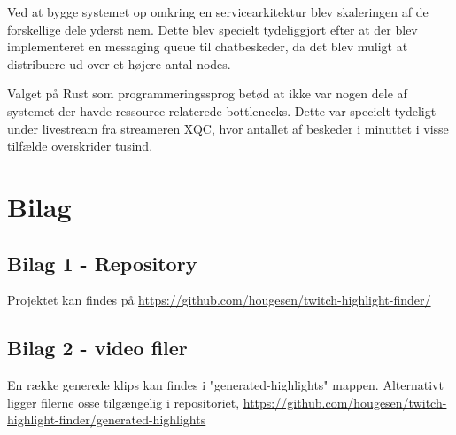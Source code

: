 \documentclass{article}
\begin{document}
Ved at bygge systemet op omkring en servicearkitektur blev skaleringen af de forskellige dele yderst nem. Dette blev specielt tydeliggjort efter at der blev implementeret en messaging queue til chatbeskeder, da det blev muligt at distribuere ud over et højere antal nodes.

Valget på Rust som programmeringssprog betød at ikke var nogen dele af systemet der havde ressource relaterede bottlenecks. Dette var specielt tydeligt under livestream fra streameren XQC, hvor antallet af beskeder i minuttet i visse tilfælde overskrider tusind.





\section{Bilag}

\subsection{Bilag 1 - Repository}
Projektet kan findes på \url{https://github.com/hougesen/twitch-highlight-finder/}

\subsection{Bilag 2 - video filer}
En række generede klips kan findes i "generated-highlights" mappen. Alternativt ligger filerne osse tilgængelig i repositoriet, \url{https://github.com/hougesen/twitch-highlight-finder/generated-highlights}
\end{document}
